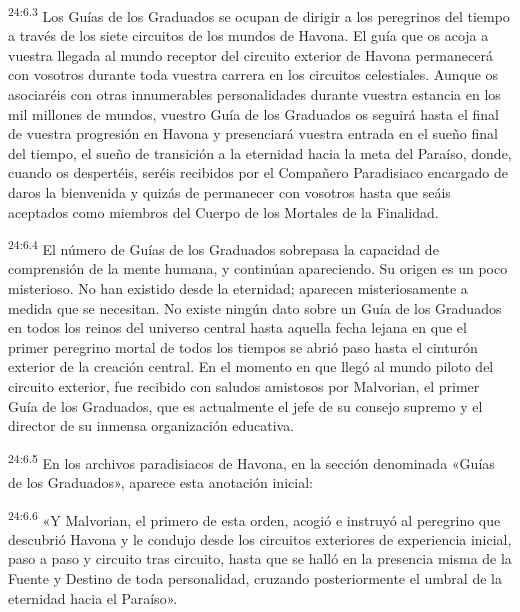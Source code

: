 \par
\textsuperscript{24:6.3} Los Guías de los Graduados se ocupan de dirigir a los peregrinos del tiempo a través de los siete circuitos de los mundos de Havona. El guía que os acoja a vuestra llegada al mundo receptor del circuito exterior de Havona permanecerá con vosotros durante toda vuestra carrera en los circuitos celestiales. Aunque os asociaréis con otras innumerables personalidades durante vuestra estancia en los mil millones de mundos, vuestro Guía de los Graduados os seguirá hasta el final de vuestra progresión en Havona y presenciará vuestra entrada en el sueño final del tiempo, el sueño de transición a la eternidad hacia la meta del Paraíso, donde, cuando os despertéis, seréis recibidos por el Compañero Paradisiaco encargado de daros la bienvenida y quizás de permanecer con vosotros hasta que seáis aceptados como miembros del Cuerpo de los Mortales de la Finalidad.

\par
\textsuperscript{24:6.4} El número de Guías de los Graduados sobrepasa la capacidad de comprensión de la mente humana, y continúan apareciendo. Su origen es un poco misterioso. No han existido desde la eternidad; aparecen misteriosamente a medida que se necesitan. No existe ningún dato sobre un Guía de los Graduados en todos los reinos del universo central hasta aquella fecha lejana en que el primer peregrino mortal de todos los tiempos se abrió paso hasta el cinturón exterior de la creación central. En el momento en que llegó al mundo piloto del circuito exterior, fue recibido con saludos amistosos por Malvorian, el primer Guía de los Graduados, que es actualmente el jefe de su consejo supremo y el director de su inmensa organización educativa.

\par
\textsuperscript{24:6.5} En los archivos paradisiacos de Havona, en la sección denominada «Guías de los Graduados», aparece esta anotación inicial:

\par
\textsuperscript{24:6.6} «Y Malvorian, el primero de esta orden, acogió e instruyó al peregrino que descubrió Havona y le condujo desde los circuitos exteriores de experiencia inicial, paso a paso y circuito tras circuito, hasta que se halló en la presencia misma de la Fuente y Destino de toda personalidad, cruzando posteriormente el umbral de la eternidad hacia el Paraíso».

